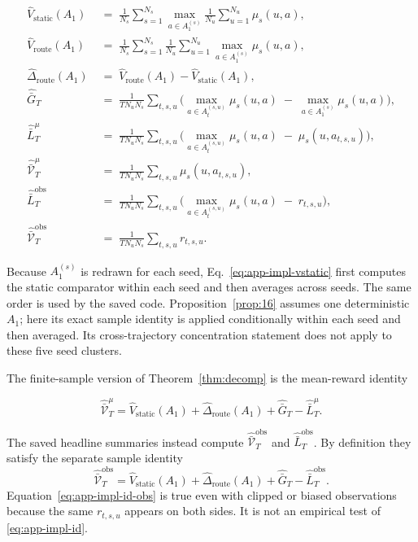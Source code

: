 \documentclass{article} %
\begin{document}
\begin{align}
\label{eq:app-impl-vstatic}
\widehat V_{\mathrm{static}}(A_1) &\;=\; \frac{1}{N_s}\sum_{s=1}^{N_s}
\max_{a \in A_1^{(s)}}\frac{1}{N_u}\sum_{u=1}^{N_u}\mu_s(u,a),\\
\label{eq:app-impl-vroute}
\widehat V_{\mathrm{route}}(A_1) &\;=\; \frac{1}{N_s}\sum_{s=1}^{N_s}
\frac{1}{N_u}\sum_{u=1}^{N_u}\max_{a \in A_1^{(s)}}\mu_s(u,a),\\
\label{eq:app-impl-dhet}
\widehat\Delta_{\mathrm{route}}(A_1) &\;=\; \widehat V_{\mathrm{route}}(A_1) - \widehat V_{\mathrm{static}}(A_1),\\
\label{eq:app-impl-Gt}
\widehat{\bar G}_T &\;=\; \frac{1}{T N_u N_s}\sum_{t,s,u}\!\Big(\max_{a \in A_t^{(s,u)}}\mu_s(u, a) \;-\; \max_{a \in A_1^{(s)}}\mu_s(u, a)\Big),\\
\label{eq:app-impl-Lt-mean}
\widehat{\bar L}_T^\mu &\;=\; \frac{1}{T N_u N_s}\sum_{t,s,u}\!\Big(\max_{a \in A_t^{(s,u)}}\mu_s(u, a) \;-\; \mu_s(u,a_{t,s,u})\Big),\\
\label{eq:app-impl-V-mean}
\widehat{\bar{\mathcal V}}_T^\mu &\;=\; \frac{1}{T N_u N_s}\sum_{t,s,u}\mu_s(u,a_{t,s,u}),\\
\label{eq:app-impl-Lt}
\widehat{\bar L}_T^{\mathrm{obs}} &\;=\; \frac{1}{T N_u N_s}\sum_{t,s,u}\!\Big(\max_{a \in A_t^{(s,u)}}\mu_s(u, a) \;-\; r_{t,s,u}\Big),\\
\label{eq:app-impl-V}
\widehat{\bar{\mathcal V}}_T^{\mathrm{obs}} &\;=\; \frac{1}{T N_u N_s}\sum_{t,s,u} r_{t,s,u}.
\end{align}

Because \(A_1^{(s)}\) is redrawn for each seed, Eq.~\eqref{eq:app-impl-vstatic}
first computes the static comparator within each seed and then averages across
seeds. The same order is used by the saved code. Proposition~\ref{prop:16}
assumes one deterministic \(A_1\); here its exact sample identity is applied
conditionally within each seed and then averaged. Its cross-trajectory
concentration statement does not apply to these five seed clusters.

The finite-sample version of Theorem~\ref{thm:decomp} is the mean-reward identity

\begin{equation}
\label{eq:app-impl-id}
\widehat{\bar{\mathcal V}}_T^\mu
=
\widehat V_{\mathrm{static}}(A_1)
+\widehat\Delta_{\mathrm{route}}(A_1)
+\widehat{\bar G}_T
-\widehat{\bar L}_T^\mu.
\end{equation}

The saved headline summaries instead compute
\(\widehat{\bar{\mathcal V}}_T^{\mathrm{obs}}\) and
\(\widehat{\bar L}_T^{\mathrm{obs}}\). By definition they satisfy the separate
sample identity
\begin{equation}
\label{eq:app-impl-id-obs}
\widehat{\bar{\mathcal V}}_T^{\mathrm{obs}}
=
\widehat V_{\mathrm{static}}(A_1)
+\widehat\Delta_{\mathrm{route}}(A_1)
+\widehat{\bar G}_T
-\widehat{\bar L}_T^{\mathrm{obs}}.
\end{equation}
Equation~\eqref{eq:app-impl-id-obs} is true even with clipped or biased
observations because the same \(r_{t,s,u}\) appears on both sides. It is not an
empirical test of \eqref{eq:app-impl-id}.
\end{document}
